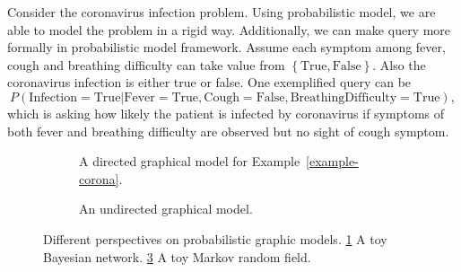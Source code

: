 \begin{example}\label{example-corona}
  Consider the coronavirus infection problem. Using probabilistic model, we are able to model the problem in a rigid way. Additionally, we can make query more formally in probabilistic model framework. Assume each symptom among fever, cough and breathing difficulty can take value from $\left\{ \mathrm{True}, \mathrm{False} \right\}$. Also the coronavirus infection is either true or false. One exemplified query can be
  \begin{equation}
    P(\mathrm{Infection} = \mathrm{True} | \mathrm{Fever} = \mathrm{True}, \mathrm{Cough} = \mathrm{False}, \mathrm{Breathing Difficulty}= \mathrm{True}), \nonumber
  \end{equation}
  which is asking how likely the patient is infected by coronavirus if symptoms of both fever and breathing difficulty are observed but no sight of cough symptom.

\end{example}

\begin{figure}[!t]
  \begin{subfigure}{.4\textwidth}
    \caption{A directed graphical model for Example~\ref{example-corona}.}
    \label{fig:dag-coronavirus}
  \end{subfigure}\hspace{2.5cm}
  \begin{subfigure}{0.3\textwidth}
    \caption{An undirected graphical model.}
    \label{fig:mrf-communication}
  \end{subfigure}
  \caption{Different perspectives on probabilistic graphic models. \ref{fig:dag-coronavirus} A toy Bayesian network. \ref{fig:mrf-communication} A toy Markov random field.}
  \hspace{1cm}
\end{figure}



